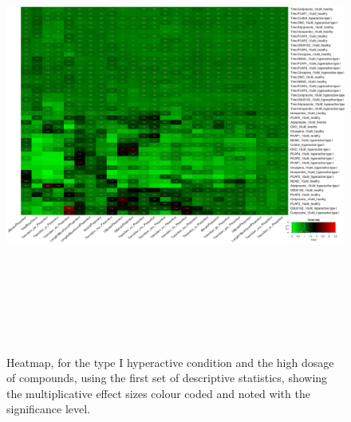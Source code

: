 \documentclass[a4paper,12pt]{article}
\begin{document}
\begin{figure}[h!]
\begin{center}
\includegraphics[width=16cm,height=15cm]{DarkApoHigh_heatmap_10_microM_DarkApoHigh_B2MAP.png}
\caption{Heatmap, for the type I hyperactive condition and the high dosage of compounds, using the first set of descriptive statistics, showing the multiplicative effect sizes colour coded and noted with the significance level.}
\end{center}
\end{figure}
\newpage
\end{document}
